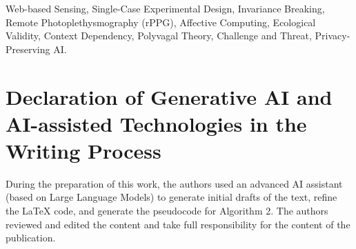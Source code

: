 \documentclass[journal]{IEEEtran}
\begin{document}
\begin{abstract}
\textbf{\textit{Results}}: Our results reveal a robust and significant interaction between environmental context and psychophysiological reactivity. 
A 2-way Analysis of Variance (ANOVA) demonstrated that while "Threat" framing significantly enhanced behavioral performance 
(Reaction Time acceleration, $p=0.002, d=-0.41$) and induced physiological freezing ($p=0.08, d=-0.33$) in the University setting, 
these effects were completely abolished in the Home environment ($p>0.30$, negligible effect sizes). 
Bayesian analysis provided strong evidence for this dissociation (BF$_{10}=66.7$ in Lab vs. BF$_{10}=1.7$ at Home). 
Furthermore, a Linear Mixed-Effects Model confirmed that these effects were not attributable to habituation over time.

\textbf{\textit{Conclusion}}: These findings provide empirical support for the "Safe Haven" hypothesis (Context-Dependent Attenuation), suggesting that familiar, 
safe environments act as powerful moderators of the autonomic nervous system, effectively buffering the impact of cognitive stressors. 
We discuss the profound implications of this "Invariance Breaking" for the design of next-generation ubiquitous computing systems, 
arguing that future affective models must be dynamically parameterized by the user's environmental context 
to avoid catastrophic misinterpretation of physiological signals.
\end{abstract}

\begin{IEEEkeywords}
Web-based Sensing, Single-Case Experimental Design, Invariance Breaking, Remote Photoplethysmography (rPPG), 
Affective Computing, Ecological Validity, Context Dependency, Polyvagal Theory, Challenge and Threat, Privacy-Preserving AI.
\end{IEEEkeywords}

\section*{Declaration of Generative AI and AI-assisted Technologies in the Writing Process}
During the preparation of this work, the authors used an advanced AI assistant (based on Large Language Models) to generate initial drafts of the text, refine the LaTeX code, and generate the pseudocode for Algorithm 2. The authors reviewed and edited the content and take full responsibility for the content of the publication.
\end{document}
